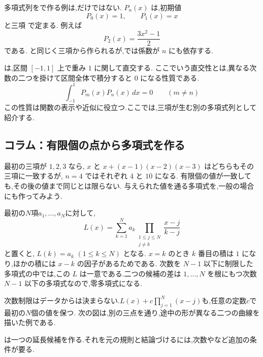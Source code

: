 多項式列をで作る例は,だけではない.
 $P_n(x)$ は,初期値
\[
  P_0(x)=1,\qquad P_1(x)=x
\]
と三項
\BookMathLayout{
\[
\begin{aligned}
(n+1)P_{n+1}(x)&=(2n+1)xP_n(x)\\
&\quad-nP_{n-1}(x)\qquad(n\ge1)
\end{aligned}
\]
}{
\[
\begin{aligned}
(n+1)P_{n+1}(x)&=(2n+1)xP_n(x)\\
&\quad-nP_{n-1}(x)\qquad(n\ge1)
\end{aligned}
\]
}
で定まる.
例えば
\[
  P_2(x)=\frac{3x^2-1}{2}
\]
である.
と同じく三項から作られるが,では係数が $n$ にも依存する.

は,区間 $[-1,1]$ 上で重み $1$ に関して直交する.
ここでいう直交性とは,異なる次数の二つを掛けて区間全体で積分すると $0$ になる性質である.
\[
  \int_{-1}^{1}P_m(x)P_n(x)\,dx=0
  \qquad(m\ne n)
\]
この性質は関数の表示や近似に役立つ.ここでは,三項が生む別の多項式列として紹介する.

\subsection*{コラム：有限個の点から多項式を作る}

最初の三項が $1,2,3$ なら,
$x$ と $x+(x-1)(x-2)(x-3)$ はどちらもその三項に一致するが,
$n=4$ ではそれぞれ $4$ と $10$ になる.
有限個の値が一致しても,その後の値まで同じとは限らない.
与えられた値を通る多項式を,一般の場合にも作ってみよう.

最初の$N$項$a_1,\ldots,a_N$に対して,
\[
  L(x)=\sum_{k=1}^{N}a_k
  \prod_{\substack{1\le j\le N\\j\ne k}}
  \frac{x-j}{k-j}
\]
と置くと, $L(k)=a_k$ $(1\le k\le N)$ となる.
$x=k$ のとき $k$ 番目の積は $1$ になり,ほかの積には $x-k$ の因子があるためである.
次数を $N-1$ 以下に制限した多項式の中では,この $L$ は一意である.二つの候補の差は $1,\ldots,N$ を根にもつ次数 $N-1$ 以下の多項式なので,零多項式になる.

次数制限はデータからは決まらない.$L(x)+c\prod_{j=1}^{N}(x-j)$も,任意の定数$c$で最初の$N$個の値を保つ.
次の図は,別の三点を通り,途中の形が異なる二つの曲線を描いた例である.
  \BookFigLagrange

は一つの延長候補を作る.それを元の規則と結論づけるには,次数やなど追加の条件が要る.

